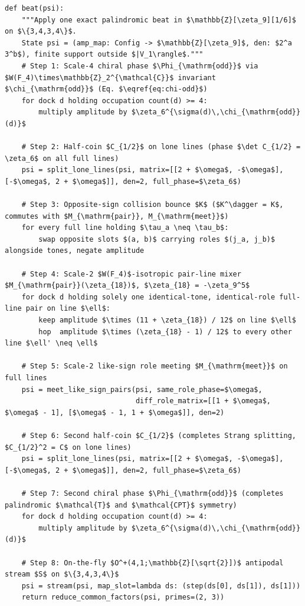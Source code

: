 \begin{algorithm}[htbp]
\caption{Complete specification of one palindromic microscopic beat (Equation~\eqref{eq:beat}) over exact
$\mathbb{Z}[\zeta_9][1/6]$ amplitudes, implemented directly in the self-contained, zero-import, pure-
reference script \universecode\ in the companion repository \cite{cluesurf2026repo}.}
\label{alg:beat}
\begin{minipage}{\linewidth}
\begin{lstlisting}[style=pyalg]
def beat(psi):
    """Apply one exact palindromic beat in $\mathbb{Z}[\zeta_9][1/6]$ on $\{3,4,3,4\}$.
    State psi = (amp_map: Config -> $\mathbb{Z}[\zeta_9]$, den: $2^a 3^b$), finite support outside $|V_1\rangle$."""
    # Step 1: Scale-4 chiral phase $\Phi_{\mathrm{odd}}$ via $W(F_4)\times\mathbb{Z}_2^{\mathcal{C}}$ invariant $\chi_{\mathrm{odd}}$ (Eq. $\eqref{eq:chi-odd}$)
    for dock d holding occupation count(d) >= 4:
        multiply amplitude by $\zeta_6^{\sigma(d)\,\chi_{\mathrm{odd}}(d)}$

    # Step 2: Half-coin $C_{1/2}$ on lone lines (phase $\det C_{1/2} = \zeta_6$ on all full lines)
    psi = split_lone_lines(psi, matrix=[[2 + $\omega$, -$\omega$], [-$\omega$, 2 + $\omega$]], den=2, full_phase=$\zeta_6$)

    # Step 3: Opposite-sign collision bounce $K$ ($K^\dagger = K$, commutes with $M_{\mathrm{pair}}, M_{\mathrm{meet}}$)
    for every full line holding $\tau_a \neq \tau_b$:
        swap opposite slots $(a, b)$ carrying roles $(j_a, j_b)$ alongside tones, negate amplitude

    # Step 4: Scale-2 $W(F_4)$-isotropic pair-line mixer $M_{\mathrm{pair}}(\zeta_{18})$, $\zeta_{18} = -\zeta_9^5$
    for dock d holding solely one identical-tone, identical-role full-line pair on line $\ell$:
        keep amplitude $\times (11 + \zeta_{18}) / 12$ on line $\ell$
        hop  amplitude $\times (\zeta_{18} - 1) / 12$ to every other line $\ell' \neq \ell$

    # Step 5: Scale-2 like-sign role meeting $M_{\mathrm{meet}}$ on full lines
    psi = meet_like_sign_pairs(psi, same_role_phase=$\omega$,
                               diff_role_matrix=[[1 + $\omega$, $\omega$ - 1], [$\omega$ - 1, 1 + $\omega$]], den=2)

    # Step 6: Second half-coin $C_{1/2}$ (completes Strang splitting, $C_{1/2}^2 = C$ on lone lines)
    psi = split_lone_lines(psi, matrix=[[2 + $\omega$, -$\omega$], [-$\omega$, 2 + $\omega$]], den=2, full_phase=$\zeta_6$)

    # Step 7: Second chiral phase $\Phi_{\mathrm{odd}}$ (completes palindromic $\mathcal{T}$ and $\mathcal{CPT}$ symmetry)
    for dock d holding occupation count(d) >= 4:
        multiply amplitude by $\zeta_6^{\sigma(d)\,\chi_{\mathrm{odd}}(d)}$

    # Step 8: On-the-fly $O^+(4,1;\mathbb{Z}[\sqrt{2}])$ antipodal stream $S$ on $\{3,4,3,4\}$
    psi = stream(psi, map_slot=lambda ds: (step(ds[0], ds[1]), ds[1]))
    return reduce_common_factors(psi, primes=(2, 3))
\end{lstlisting}
\end{minipage}
\end{algorithm}

